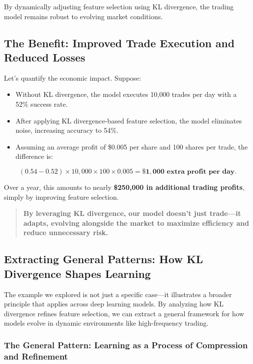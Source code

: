 By dynamically adjusting feature selection using KL divergence, the trading model remains robust to evolving market conditions.

\subsection{The Benefit: Improved Trade Execution and Reduced Losses}

Let’s quantify the economic impact. Suppose:

\begin{itemize}
    \item Without KL divergence, the model executes 10,000 trades per day with a 52\% success rate.
    \item After applying KL divergence-based feature selection, the model eliminates noise, increasing accuracy to 54\%.
    \item Assuming an average profit of \$0.005 per share and 100 shares per trade, the difference is:
\end{itemize}

\[
(0.54 - 0.52) \times 10,000 \times 100 \times 0.005 = \mathbf{\$1,000 \text{ extra profit per day}}.
\]

Over a year, this amounts to nearly \textbf{\$250,000 in additional trading profits}, simply by improving feature selection.

\begin{quote}
\textbf{By leveraging KL divergence, our model doesn’t just trade—it adapts, evolving alongside the market to maximize efficiency and reduce unnecessary risk.}
\end{quote}

\subsection{Extracting General Patterns: How KL Divergence Shapes Learning}

The example we explored is not just a specific case—it illustrates a broader principle that applies across deep learning models. By analyzing how KL divergence refines feature selection, we can extract a general framework for how models evolve in dynamic environments like high-frequency trading.

\subsubsection*{The General Pattern: Learning as a Process of Compression and Refinement}

